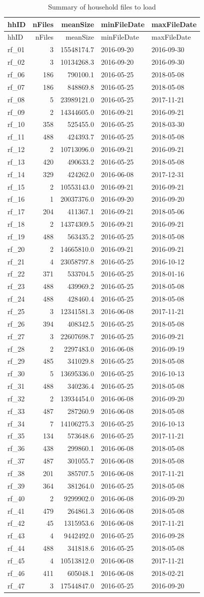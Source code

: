\documentclass[]{article}
\begin{document}
\begin{longtable}[]{@{}lrrll@{}}
\caption{Summary of household files to load}\tabularnewline
\toprule
hhID & nFiles & meanSize & minFileDate & maxFileDate\tabularnewline
\midrule
\endfirsthead
\toprule
hhID & nFiles & meanSize & minFileDate & maxFileDate\tabularnewline
\midrule
\endhead
rf\_01 & 3 & 15548174.7 & 2016-09-20 & 2016-09-30\tabularnewline
rf\_02 & 3 & 10134268.3 & 2016-09-20 & 2016-09-30\tabularnewline
rf\_06 & 186 & 790100.1 & 2016-05-25 & 2018-05-08\tabularnewline
rf\_07 & 186 & 848869.8 & 2016-05-25 & 2018-05-08\tabularnewline
rf\_08 & 5 & 23989121.0 & 2016-05-25 & 2017-11-21\tabularnewline
rf\_09 & 2 & 14344605.0 & 2016-09-21 & 2016-09-21\tabularnewline
rf\_10 & 358 & 525455.0 & 2016-05-25 & 2018-03-30\tabularnewline
rf\_11 & 488 & 424393.7 & 2016-05-25 & 2018-05-08\tabularnewline
rf\_12 & 2 & 10713096.0 & 2016-09-21 & 2016-09-21\tabularnewline
rf\_13 & 420 & 490633.2 & 2016-05-25 & 2018-05-08\tabularnewline
rf\_14 & 329 & 424262.0 & 2016-06-08 & 2017-12-31\tabularnewline
rf\_15 & 2 & 10553143.0 & 2016-09-21 & 2016-09-21\tabularnewline
rf\_16 & 1 & 20037376.0 & 2016-09-20 & 2016-09-20\tabularnewline
rf\_17 & 204 & 411367.1 & 2016-09-21 & 2018-05-06\tabularnewline
rf\_18 & 2 & 14374309.5 & 2016-09-21 & 2016-09-21\tabularnewline
rf\_19 & 488 & 563435.2 & 2016-05-25 & 2018-05-08\tabularnewline
rf\_20 & 2 & 14665810.0 & 2016-09-21 & 2016-09-21\tabularnewline
rf\_21 & 4 & 23058797.8 & 2016-05-25 & 2016-10-12\tabularnewline
rf\_22 & 371 & 533704.5 & 2016-05-25 & 2018-01-16\tabularnewline
rf\_23 & 488 & 439969.2 & 2016-05-25 & 2018-05-08\tabularnewline
rf\_24 & 488 & 428460.4 & 2016-05-25 & 2018-05-08\tabularnewline
rf\_25 & 3 & 12341581.3 & 2016-06-08 & 2017-11-21\tabularnewline
rf\_26 & 394 & 408342.5 & 2016-05-25 & 2018-05-08\tabularnewline
rf\_27 & 3 & 22607698.7 & 2016-05-25 & 2016-09-21\tabularnewline
rf\_28 & 2 & 2297483.0 & 2016-06-08 & 2016-09-19\tabularnewline
rf\_29 & 485 & 341029.8 & 2016-05-25 & 2018-05-08\tabularnewline
rf\_30 & 5 & 13695336.0 & 2016-05-25 & 2016-10-13\tabularnewline
rf\_31 & 488 & 340236.4 & 2016-05-25 & 2018-05-08\tabularnewline
rf\_32 & 2 & 13934454.0 & 2016-06-08 & 2016-09-20\tabularnewline
rf\_33 & 487 & 287260.9 & 2016-06-08 & 2018-05-08\tabularnewline
rf\_34 & 7 & 14106275.3 & 2016-05-25 & 2016-10-13\tabularnewline
rf\_35 & 134 & 573648.6 & 2016-05-25 & 2017-11-21\tabularnewline
rf\_36 & 438 & 299860.1 & 2016-06-08 & 2018-05-08\tabularnewline
rf\_37 & 487 & 301055.7 & 2016-06-08 & 2018-05-08\tabularnewline
rf\_38 & 201 & 385707.5 & 2016-06-08 & 2017-11-21\tabularnewline
rf\_39 & 364 & 381264.0 & 2016-05-25 & 2018-05-08\tabularnewline
rf\_40 & 2 & 9299902.0 & 2016-06-08 & 2016-09-20\tabularnewline
rf\_41 & 479 & 264861.3 & 2016-06-08 & 2018-05-08\tabularnewline
rf\_42 & 45 & 1315953.6 & 2016-06-08 & 2017-11-21\tabularnewline
rf\_43 & 4 & 9442492.0 & 2016-05-25 & 2016-09-28\tabularnewline
rf\_44 & 488 & 341818.6 & 2016-05-25 & 2018-05-08\tabularnewline
rf\_45 & 4 & 10513812.0 & 2016-06-08 & 2017-11-21\tabularnewline
rf\_46 & 411 & 605048.1 & 2016-06-08 & 2018-02-21\tabularnewline
rf\_47 & 3 & 17544847.0 & 2016-05-25 & 2016-09-20\tabularnewline
\bottomrule
\end{longtable}
\end{document}

